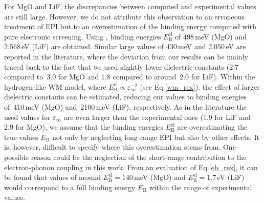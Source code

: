 For MgO and LiF, the discrepancies between computed and experimental values are still large. However, we do not attribute this observation to an erroneous treatment of EPI but to an overestimation of the binding energy computed with pure electronic screening. Using \exciting{}, binding energies $E^\text{el}_\text{B}$  of 498\,meV (MgO) and 2.568\,eV (LiF) are obtained. Similar large values of 430\,meV and 2.050\,eV are reported in the literature\cite{fuchs_08,low_cost}, where the deviation from our results can be mainly traced back to the fact that we used slightly lower dielectric constants (2.7 compared to~3.0  for MgO and 1.8  compared to around~2.0 for LiF). Within the hydrogen-like WM model, where $E^\text{el}_\text{B}\propto\varepsilon^{-2}_\infty$ (see Eq.\;\eqref{wm_rex}), the effect of larger dielectric constants can be estimated, reducing our values to binding energies of~410\,meV  (MgO) and~2100\,meV (LiF), respectively.  As in the literature\cite{fuchs_08,low_cost} the used values for $\varepsilon_\infty$ are even larger than the experimental ones (1.9 for LiF and 2.9 for MgO), we assume that the binding energies $E^\text{el}_\text{B}$ are overestimating the true values  $E_\text{B}^{\phantom{l}}$ not only by neglecting long-range EPI but also by other effects. It is, however, difficult to specify where this overestimation stems from. One possible reason could be the neglection of the short-range contribution to the electron-phonon coupling in this work. From an evaluation of Eq.\;\eqref{eb_rex}, it can be found that values of around $E^\text{el}_\text{B}=140$\,meV (MgO) and $E^\text{el}_\text{B}=1.7$\,eV (LiF) would correspond to a full binding energy $E_\text{B}^{\phantom{l}}$ within the range of experimental values.\par


